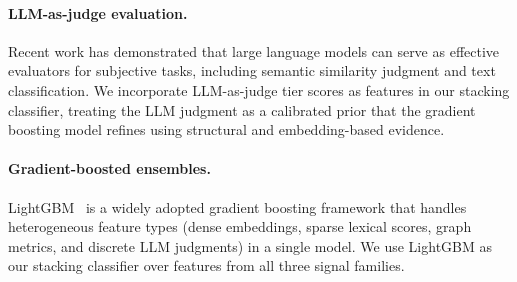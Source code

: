\paragraph{LLM-as-judge evaluation.}
Recent work has demonstrated that large language models can serve as
effective evaluators for subjective tasks, including semantic similarity
judgment and text classification. We incorporate LLM-as-judge tier
scores as features in our stacking classifier, treating the LLM
judgment as a calibrated prior that the gradient boosting model refines
using structural and embedding-based evidence.

\paragraph{Gradient-boosted ensembles.}
LightGBM~\citep{ke2017lightgbm} is a widely adopted gradient boosting
framework that handles heterogeneous feature types (dense embeddings,
sparse lexical scores, graph metrics, and discrete LLM judgments) in a
single model. We use LightGBM as our stacking classifier over features
from all three signal families.
